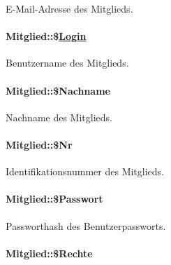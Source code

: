 E-Mail-Adresse des Mitglieds. 

\hypertarget{classMitglied_626ee2f2551cc2840bdeac6a04491b2e}{
\paragraph[\$Login]{\setlength{\rightskip}{0pt plus 5cm}Mitglied::\$\hyperlink{classLogin}{Login}}\hfill}
\label{classMitglied_626ee2f2551cc2840bdeac6a04491b2e}


Benutzername des Mitglieds. 

\hypertarget{classMitglied_635def9ec266748689397299c7f79d9c}{
\paragraph[\$Nachname]{\setlength{\rightskip}{0pt plus 5cm}Mitglied::\$Nachname}\hfill}
\label{classMitglied_635def9ec266748689397299c7f79d9c}


Nachname des Mitglieds. 

\hypertarget{classMitglied_113efe44273361b7c167c729666ad04c}{
\paragraph[\$Nr]{\setlength{\rightskip}{0pt plus 5cm}Mitglied::\$Nr}\hfill}
\label{classMitglied_113efe44273361b7c167c729666ad04c}


Identifikationsnummer des Mitglieds. 

\hypertarget{classMitglied_94f43b65c468ad42ac45be064d015446}{
\paragraph[\$Passwort]{\setlength{\rightskip}{0pt plus 5cm}Mitglied::\$Passwort}\hfill}
\label{classMitglied_94f43b65c468ad42ac45be064d015446}


Passworthash des Benutzerpassworts. 

\hypertarget{classMitglied_adadc54a72a46a089ddec43855ba3c7e}{
\paragraph[\$Rechte]{\setlength{\rightskip}{0pt plus 5cm}Mitglied::\$Rechte}\hfill}
\label{classMitglied_adadc54a72a46a089ddec43855ba3c7e}


